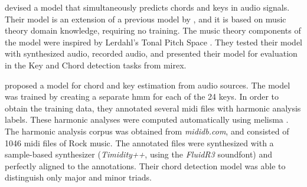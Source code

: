 


\textcite{catteau2007probabilistic} devised a model that
simultaneously predicts chords and keys in audio signals.
Their model is an extension of a previous model by
\textcite{bello2005robust}, and it is based on music theory
domain knowledge, requiring no training. The music theory
components of the model were inspired by Lerdahl's Tonal
Pitch Space \parencite{lerdahl2005tonal}. They tested their
model with synthesized audio, recorded audio, and presented
their model for evaluation in the Key and Chord detection
tasks from \gls{mirex}. 



\textcite{lee2007unified} proposed a model for chord and key
estimation from audio sources. The model was trained by
creating a separate \gls{hmm} for each of the 24 keys. In
order to obtain the training data, they annotated several
\gls{midi} files with harmonic analysis labels. These
harmonic analyses were computed automatically using
\gls{melisma} \parencite{temperley2004cognition}. The
harmonic analysis corpus was obtained from
\emph{mididb.com}, and consisted of 1046 \gls{midi} files of
Rock music. The annotated files were synthesized with a
sample-based synthesizer
(\emph{Timidity++},
using the
\emph{FluidR3}
soundfont) and perfectly aligned to the annotations. Their
chord detection model was able to distinguish only major and
minor triads.

